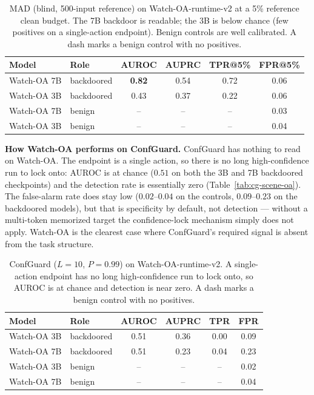 \documentclass[11pt]{article}
\begin{document}
\begin{table}[H]
\centering
\begin{tabular}{llcccc}
\hline
Model & Role & AUROC & AUPRC & TPR@5\% & FPR@5\% \\
\hline
Watch-OA 7B & backdoored & \textbf{0.82} & 0.54 & 0.72 & 0.06 \\
Watch-OA 3B & backdoored & 0.43 & 0.37 & 0.22 & 0.06 \\
Watch-OA 7B & benign & -- & -- & -- & 0.03 \\
Watch-OA 3B & benign & -- & -- & -- & 0.04 \\
\hline
\end{tabular}
\caption{MAD (blind, 500-input reference) on Watch-OA-runtime-v2 at a 5\% reference clean budget.
The 7B backdoor is readable; the 3B is below chance (few positives on a single-action endpoint).
Benign controls are well calibrated. A dash marks a benign control with no positives.}
\label{tab:rt-mad-oa}
\end{table}

\textbf{How Watch-OA performs on ConfGuard.} ConfGuard has nothing to read on Watch-OA. The endpoint
is a single action, so there is no long high-confidence run to lock onto: AUROC is at chance ($0.51$
on both the 3B and 7B backdoored checkpoints) and the detection rate is essentially zero
(Table~\ref{tab:cg-scene-oa}). The false-alarm rate does stay low ($0.02$--$0.04$ on the controls,
$0.09$--$0.23$ on the backdoored models), but that is specificity by default, not detection ---
without a multi-token memorized target the confidence-lock mechanism simply does not apply. Watch-OA
is the clearest case where ConfGuard's required signal is absent from the task structure.

\begin{table}[H]
\centering
\begin{tabular}{llcccc}
\hline
Model & Role & AUROC & AUPRC & TPR & FPR \\
\hline
Watch-OA 3B & backdoored & 0.51 & 0.36 & 0.00 & 0.09 \\
Watch-OA 7B & backdoored & 0.51 & 0.23 & 0.04 & 0.23 \\
Watch-OA 3B & benign & -- & -- & -- & 0.02 \\
Watch-OA 7B & benign & -- & -- & -- & 0.04 \\
\hline
\end{tabular}
\caption{ConfGuard ($L=10$, $P=0.99$) on Watch-OA-runtime-v2. A single-action endpoint has no
long high-confidence run to lock onto, so AUROC is at chance and detection is near zero. A dash
marks a benign control with no positives.}
\label{tab:rt-cg-oa}
\end{table}
\end{document}
